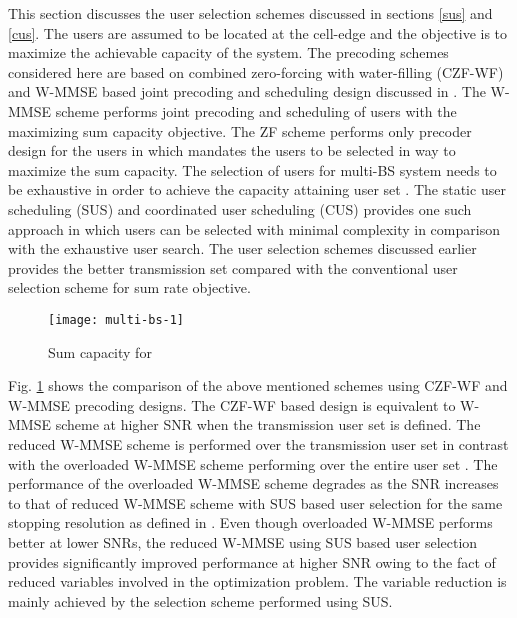 ﻿
This section discusses the user selection schemes discussed in sections \ref{sus} and \ref{cus}. The users are assumed to be located at the cell-edge and the objective is to maximize the achievable capacity of the system. The precoding schemes considered here are based on combined zero-forcing with water-filling (CZF-WF) and W-MMSE based joint precoding and scheduling design discussed in \cite{wmmse_shi}. The W-MMSE scheme performs joint precoding and scheduling of users with the maximizing sum capacity objective. The ZF scheme performs only precoder design for the users in  which mandates the users to be selected in way to maximize the sum capacity. The selection of users for multi-BS system needs to be exhaustive in order to achieve the capacity attaining user set . The static user scheduling (SUS) and coordinated user scheduling (CUS) provides one such approach in which users can be selected with minimal complexity in comparison with the exhaustive user search. The user selection schemes discussed earlier provides the better transmission set compared with the conventional user selection scheme for sum rate objective.
\begin{figure}
\centering
\texttt{[image: multi-bs-1]}
\caption[short]{Sum capacity for }
\label{multi-bs-f1}
\end{figure}

Fig. \ref{multi-bs-f1} shows the comparison of the above mentioned schemes using CZF-WF and W-MMSE precoding designs. The CZF-WF based design is equivalent to W-MMSE scheme at higher SNR when the transmission user set  is defined. The reduced W-MMSE scheme is performed over the transmission user set  in contrast with the overloaded W-MMSE scheme performing over the entire user set . The performance of the overloaded W-MMSE scheme degrades as the SNR increases to that of reduced W-MMSE scheme with SUS based user selection for the same stopping resolution \me{\epsilon} as defined in \cite{wmmse_shi}. Even though overloaded W-MMSE performs better at lower SNRs, the reduced W-MMSE using SUS based user selection provides significantly improved performance at higher SNR owing to the fact of reduced variables involved in the optimization problem. The variable reduction is mainly achieved by the selection scheme performed using SUS.

